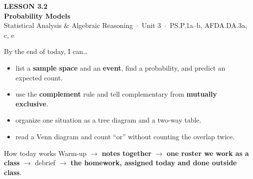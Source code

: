 \documentclass[aspectratio=169, 11pt]{beamer}
\begin{document}
{
\begin{frame}[plain]
  \vspace{2.8cm}\hspace{0.55cm}%
  \begin{minipage}{0.9\textwidth}
    {\color{goldacc}\bfseries\small LESSON 3.2}\\[0.5cm]
    {\color{white}\bfseries\LARGE Probability Models}\\[1.2cm]
    {\color{frostmid}\small Statistical Analysis \& Algebraic Reasoning~$\cdot$~Unit 3~$\cdot$~PS.P.1a--b, AFDA.DA.3a, c, e}
  \end{minipage}
\end{frame}
}

\begin{frame}[t, plain]
  By the end of today, I can\ldots
  \begin{itemize}\setlength{\itemsep}{4pt}
    \item list a \textbf{sample space} and an \textbf{event}, find a probability, and predict an
          expected count.
    \item use the \textbf{complement} rule and tell complementary from \textbf{mutually
          exclusive}.
    \item organize one situation as a tree diagram and a two-way table.
    \item read a Venn diagram and count ``or'' without counting the overlap twice.
  \end{itemize}
  \begin{block}{How today works}
    Warm-up $\to$ \textbf{notes together} $\to$ \textbf{one roster we work as a class} $\to$
    debrief $\to$ \textbf{the homework, assigned today and done outside class}.
  \end{block}
\end{frame}
\end{document}
